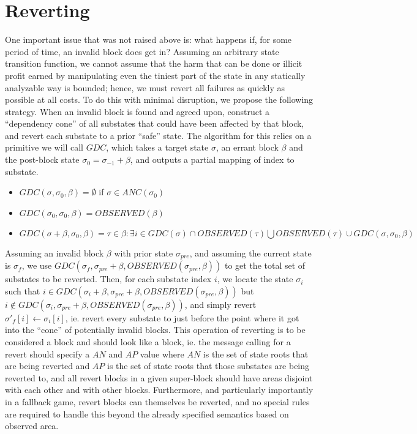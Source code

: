 \documentclass[11pt,a4paper]{report}
\theoremstyle{plain}
\theoremstyle{definition}
\theoremstyle{remark}
\begin{document}
\chapter{Reverting}

One important issue that was not raised above is: what happens if, for some period of time, an invalid block does get in? Assuming an arbitrary state transition function, we cannot assume that the harm that can be done or illicit profit earned by manipulating even the tiniest part of the state in any statically analyzable way is bounded; hence, we must revert all failures as quickly as possible at all costs. To do this with minimal disruption, we propose the following strategy. When an invalid block is found and agreed upon, construct a ``dependency cone'' of all substates that could have been affected by that block, and revert each substate to a prior ``safe'' state. The algorithm for this relies on a primitive we will call $GDC$, which takes a target state $\sigma$, an errant block $\beta$ and the post-block state $\sigma_0 = \sigma_{-1} + \beta$, and outputs a partial mapping of index to substate.

\begin{itemize}
\item
$GDC(\sigma, \sigma_0, \beta) = \emptyset$ if $\sigma \in ANC(\sigma_0)$
\item
$GDC(\sigma_0, \sigma_0, \beta) = OBSERVED(\beta)$
\item
$GDC(\sigma + \beta, \sigma_0, \beta) = {\tau \in \beta: \exists i \in GDC(\sigma) \cap OBSERVED(\tau)} \bigcup OBSERVED(\tau) \cup GDC(\sigma, \sigma_0, \beta)$
\end{itemize}

Assuming an invalid block $\beta$ with prior state $\sigma_{pre}$, and assuming the current state is $\sigma_f$, we use $GDC(\sigma_f, \sigma_{pre} + \beta, OBSERVED(\sigma_{pre}, \beta))$ to get the total set of substates to be reverted. Then, for each substate index $i$, we locate the state $\sigma_i$ such that $i \in GDC(\sigma_i + \beta, \sigma_{pre} + \beta, OBSERVED(\sigma_{pre}, \beta))$ but $i \notin GDC(\sigma_i, \sigma_{pre} + \beta, OBSERVED(\sigma_{pre}, \beta))$, and simply revert $\sigma'_f[i] \leftarrow \sigma_i[i]$, ie. revert every substate to just before the point where it got into the ``cone'' of potentially invalid blocks. This operation of reverting is to be considered a block and should look like a block, ie. the message calling for a revert should specify a $AN$ and $AP$ value where $AN$ is the set of state roots that are being reverted and $AP$ is the set of state roots that those substates are being reverted to, and all revert blocks in a given super-block should have areas disjoint with each other and with other blocks. Furthermore, and particularly importantly in a fallback game, revert blocks can themselves be reverted, and no special rules are required to handle this beyond the already specified semantics based on observed area.
\end{document}
